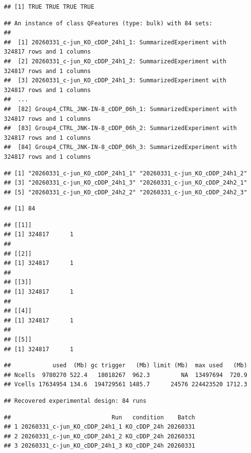 \documentclass[
  10pt,
]{article}
\begin{document}
\begin{verbatim}
## [1] TRUE TRUE TRUE TRUE
\end{verbatim}

\begin{verbatim}
## An instance of class QFeatures (type: bulk) with 84 sets:
## 
##  [1] 20260331_c-jun_KO_cDDP_24h1_1: SummarizedExperiment with 324817 rows and 1 columns 
##  [2] 20260331_c-jun_KO_cDDP_24h1_2: SummarizedExperiment with 324817 rows and 1 columns 
##  [3] 20260331_c-jun_KO_cDDP_24h1_3: SummarizedExperiment with 324817 rows and 1 columns 
##  ...
##  [82] Group4_CTRL_JNK-IN-8_cDDP_06h_1: SummarizedExperiment with 324817 rows and 1 columns 
##  [83] Group4_CTRL_JNK-IN-8_cDDP_06h_2: SummarizedExperiment with 324817 rows and 1 columns 
##  [84] Group4_CTRL_JNK-IN-8_cDDP_06h_3: SummarizedExperiment with 324817 rows and 1 columns
\end{verbatim}

\begin{verbatim}
## [1] "20260331_c-jun_KO_cDDP_24h1_1" "20260331_c-jun_KO_cDDP_24h1_2"
## [3] "20260331_c-jun_KO_cDDP_24h1_3" "20260331_c-jun_KO_cDDP_24h2_1"
## [5] "20260331_c-jun_KO_cDDP_24h2_2" "20260331_c-jun_KO_cDDP_24h2_3"
\end{verbatim}

\begin{verbatim}
## [1] 84
\end{verbatim}

\begin{verbatim}
## [[1]]
## [1] 324817      1
## 
## [[2]]
## [1] 324817      1
## 
## [[3]]
## [1] 324817      1
## 
## [[4]]
## [1] 324817      1
## 
## [[5]]
## [1] 324817      1
\end{verbatim}

\begin{verbatim}
##            used  (Mb) gc trigger   (Mb) limit (Mb)  max used   (Mb)
## Ncells  9780270 522.4   18018267  962.3         NA  13497694  720.9
## Vcells 17634954 134.6  194729561 1485.7      24576 224423520 1712.3
\end{verbatim}

\begin{verbatim}
## Recovered experimental design: 84 runs
\end{verbatim}

\begin{verbatim}
##                             Run   condition    Batch
## 1 20260331_c-jun_KO_cDDP_24h1_1 KO_cDDP_24h 20260331
## 2 20260331_c-jun_KO_cDDP_24h1_2 KO_cDDP_24h 20260331
## 3 20260331_c-jun_KO_cDDP_24h1_3 KO_cDDP_24h 20260331
\end{verbatim}
\end{document}
